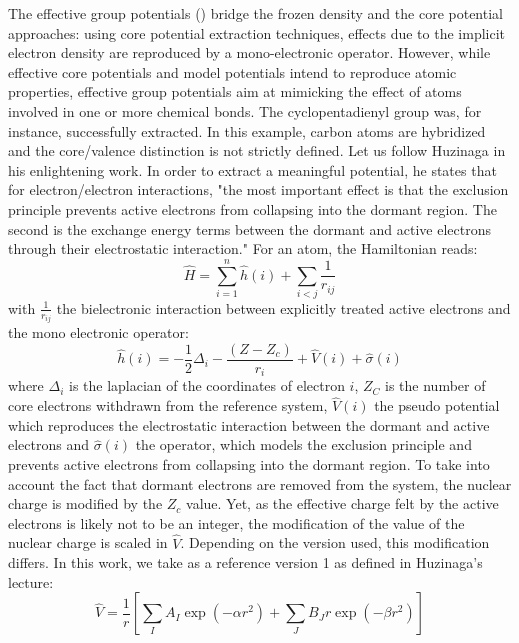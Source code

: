\documentclass[journal=jctcce,manuscript=article]{achemso}
\begin{document}
The effective group potentials (\showCustomItem) bridge the frozen density and the core potential
approaches: using core potential extraction techniques, effects due to the implicit 
electron density are reproduced by a mono-electronic operator.\cite{carissan_what_2006}
However, while effective core potentials and model potentials intend to 
reproduce atomic properties,
effective group potentials aim at mimicking the effect of atoms involved in one or more chemical
bonds. The cyclopentadienyl group was, for instance, successfully extracted.
In this example, carbon atoms are hybridized and the core/valence distinction is not 
strictly defined.
Let us follow Huzinaga in his enlightening work.\cite{huzinaga_effective_1991}
In order to extract a meaningful potential, he states that for electron/electron interactions, 
"the most important effect is that the exclusion principle prevents active electrons
from collapsing into the dormant region.
The second is the exchange energy terms between the dormant and active electrons
through their electrostatic interaction."
For an atom, the Hamiltonian reads:
\begin{equation}
\label{eq:atomicHamiltonian}
\hat{H} = \sum_{i=1}^n \hat{h}(i) +\sum_{i<j}\frac{1}{r_{ij}}
\end{equation}
with $\frac{1}{r_{ij}}$ the bielectronic interaction
between explicitly treated active electrons and
the mono electronic operator:
\begin{equation}
\label{eq:monoElectronicOperator}
\hat{h}(i) = -\frac{1}{2}\Delta_i - \frac{(Z-Z_c)}{r_i}+\hat{V}(i) + \hat{\sigma}(i)
\end{equation}
where
$\Delta_i$ is the laplacian of the coordinates of electron $i$,
$Z_C$ is the number of core electrons withdrawn from the reference system,
$\hat{V}(i)$ the pseudo potential which reproduces the electrostatic
interaction between the dormant and active electrons
and $\hat{\sigma}(i)$ the operator, which models the exclusion principle
and prevents active electrons from collapsing into the dormant region.
To take into account the fact that dormant electrons are removed from the
system, the nuclear charge is modified by the $Z_c$ value.
Yet, as the effective charge felt by the active electrons is likely not to be an integer,
the modification of the value of the nuclear charge is scaled in $\hat{V}$.
Depending on the version used, this modification differs.
In this work, we take as a reference version 1 as defined in
Huzinaga's lecture\cite{huzinaga_1994_1995}:
\begin{equation}
\label{eq:HuzinagaMPVersion1Potential}
\hat{V} = \frac{1}{r}\left[\sum_IA_I\exp(-\alpha r^2)+\sum_JB_Jr\exp(-\beta r^2)\right]
\end{equation}
\end{document}
